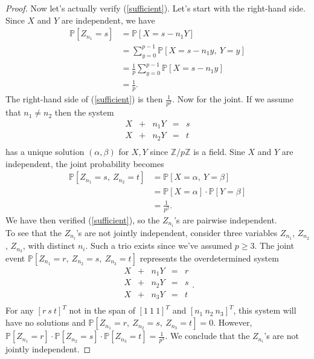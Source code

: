 \documentclass[11pt,letterpaper]{report}
\newcommand{\integers}{\mathbb{Z}}
\newcommand{\Prob}{\mathbb{P}}
\begin{document}
\begin{enumerate}
\begin{proof}
		\noindent Now let's actually verify (\ref{sufficient}).
		Let's start with the right-hand side. Since $X$ and $Y$ are independent, we have
		\begin{align*}
			\Prob[Z_{n_1} = s] &= \Prob[X = s-n_1Y]\\
			&= \sum_{y=0}^{p-1}\Prob[X=s-n_1y,\ Y=y]\\
			&= \frac{1}{p}\sum_{y=0}^{p-1}\Prob[X = s-n_1y]\\
			&= \frac{1}{p}.
		\end{align*}
		The right-hand side of (\ref{sufficient}) is then $\frac{1}{p^2}$.
		Now for the joint. If we assume that $n_1\neq n_2$ then the system
		\[
		\begin{array}{lllll}
			X &+& n_1Y &=& s\\
			X &+& n_2Y &=& t\\
		\end{array}
		\]
		has a unique solution $(\alpha, \beta)$ for $X,Y$ since $\integers/p\integers$ is a field. Sine $X$ and $Y$ are independent, the joint probability becomes
		\begin{align*}
			\Prob[Z_{n_1}=s,\ Z_{n_2}=t]&= \Prob[X = \alpha,\ Y = \beta]\\
			&= \Prob[X = \alpha]\cdot \Prob[Y = \beta]\\
			&= \frac{1}{p^2}.
		\end{align*}
		We have then verified (\ref{sufficient}), so the $Z_{n_i}$'s are pairwise independent.\\

		\noindent To see that the $Z_{n_i}$'s are not jointly independent, consider three variables $Z_{n_1}$, $Z_{n_2}$, $Z_{n_3}$, with distinct $n_i$. Such a trio exists since we've assumed $p\geq 3$. The joint event $\Prob[Z_{n_1}= r,\ Z_{n_2} = s,\ Z_{n_3} = t]$ represents the overdetermined system
		\[
		\begin{array}{lllll}
			X &+& n_1Y &=& r\\
			X &+& n_2Y &=& s\\
			X &+& n_3Y &=& t\\
		\end{array}.
		\]
		For any $[r\ s\ t]^T$ not in the span of $[1\ 1\ 1]^T$ and $[n_1\ n_2\ n_3]^T$, this system will have no solutions and $\Prob[Z_{n_1}=r,\ Z_{n_2}=s,\ Z_{n_3}=t] = 0$. However, $\Prob[Z_{n_1}=r]\cdot\Prob[Z_{n_2}=s]\cdot \Prob[Z_{n_3}=t] = \frac{1}{p^3}$. We conclude that the $Z_{n_i}$'s are not jointly independent.
	\end{proof}


\end{enumerate}
\end{document}
